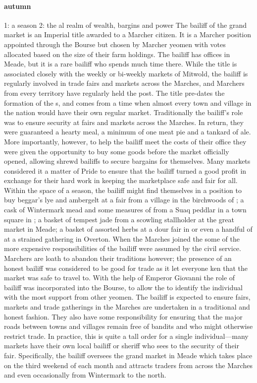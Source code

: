 \paragraph{autumn} 1: a season 2: the al realm of wealth, bargins and power 
 The bailiff of the grand market is an Imperial title awarded to a Marcher citizen. It is a Marcher position appointed through the Bourse but chosen by Marcher yeomen with votes allocated based on the size of their farm holdings. The bailiff has offices in Meade, but it is a rare bailiff who spends much time there. While the title is associated closely with the weekly or bi-weekly markets of Mitwold, the bailiff is regularly involved in trade fairs and markets across the Marches, and Marchers from every territory have regularly held the post. \localpar The title pre-dates the formation of the s, and comes from a time when almost every town and village in the nation would have their own regular market. Traditionally the bailiff's role was to ensure security at fairs and markets across the Marches. In return, they were guaranteed a hearty meal, a minimum of one meat pie and a tankard of ale. \localpar More importantly, however, to help the bailiff meet the costs of their office they were given the opportunity to buy some goods before the market officially opened, allowing shrewd bailiffs to secure bargains for themselves. Many markets considered it a matter of Pride to ensure that the bailiff turned a good profit in exchange for their hard work in keeping the marketplace safe and fair for all. Within the space of a season, the bailiff might find themselves in a position to buy beggar's lye and ambergelt at a fair from a village in the birchwoods of ; a cask of Wintermark mead and some measures of  from a Suaq peddlar in a town square in ; a basket of tempest jade from a scowling stallholder at the great market in Meade; a basket of assorted herbs at a dour fair in  or even a handful of  at a strained gathering in Overton. \localpar When the Marches joined the  some of the more expensive responsibilities of the bailiff were assumed by the civil service. Marchers are loath to abandon their traditions however; the presence of an honest bailiff was considered to be good for trade as it let everyone ken that the market was safe to travel to. With the help of Emperor Giovanni the role of bailiff was incorporated into the Bourse, to allow the  to identify the individual with the most support from other yeomen. \localpar The bailiff is expected to ensure fairs, markets and trade gatherings in the Marches are undertaken in a traditional and honest fashion. They also have some responsibility for ensuring that the major roads between towns and villages remain free of bandits and  who might otherwise restrict trade. In practice, this is quite a tall order for a single individual—many markets have their own local bailiff or sheriff who sees to the security of their fair. Specifically, the bailiff oversees the grand market in Meade which takes place on the third weekend of each month and attracts traders from across the Marches and even occasionally from Wintermark to the north. 
